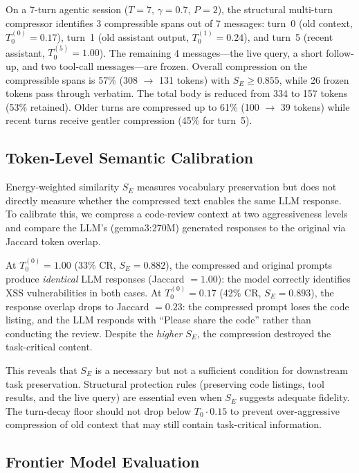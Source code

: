 \documentclass[11pt]{article}
\theoremstyle{remark}
\begin{document}
On a 7-turn agentic session ($T=7$, $\gamma=0.7$, $P=2$), the structural
multi-turn compressor identifies 3 compressible spans out of 7 messages:
turn~0 (old context, $T_0^{(0)}=0.17$), turn~1 (old assistant output,
$T_0^{(1)}=0.24$), and turn~5 (recent assistant, $T_0^{(5)}=1.00$).
The remaining 4 messages---the live query, a short follow-up, and two
tool-call messages---are frozen. Overall compression on the compressible
spans is 57\% (308 $\to$ 131 tokens) with $S_E \geq 0.855$, while 26
frozen tokens pass through verbatim. The total body is reduced from 334
to 157 tokens (53\% retained). Older turns are compressed up to 61\%
(100 $\to$ 39 tokens) while recent turns receive gentler compression
(45\% for turn~5).

\subsection{Token-Level Semantic Calibration}

Energy-weighted similarity $S_E$ measures vocabulary preservation but does
not directly measure whether the compressed text enables the same LLM
response. To calibrate this, we compress a code-review context at two
aggressiveness levels and compare the LLM's (gemma3:270M) generated
responses to the original via Jaccard token overlap.

At $T_0^{(0)} = 1.00$ (33\% CR, $S_E = 0.882$), the compressed and
original prompts produce \emph{identical} LLM responses (Jaccard $= 1.00$):
the model correctly identifies XSS vulnerabilities in both cases. At
$T_0^{(0)} = 0.17$ (42\% CR, $S_E = 0.893$), the response overlap
drops to Jaccard $= 0.23$: the compressed prompt loses the code listing,
and the LLM responds with ``Please share the code'' rather than conducting
the review. Despite the \emph{higher} $S_E$, the compression destroyed
the task-critical content.

This reveals that $S_E$ is a necessary but not a sufficient condition
for downstream task preservation. Structural protection rules (preserving
code listings, tool results, and the live query) are essential even when
$S_E$ suggests adequate fidelity. The turn-decay floor should not drop
below $T_0 \cdot 0.15$ to prevent over-aggressive compression of old
context that may still contain task-critical information.

\subsection{Frontier Model Evaluation}
\end{document}
